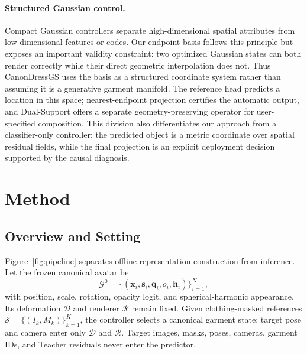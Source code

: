 \documentclass[letterpaper]{article}
\newcommand{\method}{CanonDressGS}
\newcommand{\dual}{Dual-Support}
\begin{document}
\paragraph{Structured Gaussian control.}
Compact Gaussian controllers separate high-dimensional spatial attributes from low-dimensional features or codes. Our endpoint basis follows this principle but exposes an important validity constraint: two optimized Gaussian states can both render correctly while their direct geometric interpolation does not. Thus \method{} uses the basis as a structured coordinate system rather than assuming it is a generative garment manifold. The reference head predicts a location in this space; nearest-endpoint projection certifies the automatic output, and \dual{} offers a separate geometry-preserving operator for user-specified composition.
This division also differentiates our approach from a classifier-only controller: the predicted object is a metric coordinate over spatial residual fields, while the final projection is an explicit deployment decision supported by the causal diagnosis.

\section{Method}

\subsection{Overview and Setting}

Figure~\ref{fig:pipeline} separates offline representation construction from inference. Let the frozen canonical avatar be
\begin{equation}
\mathcal{G}^{0}=\{(\mathbf{x}_{i},\mathbf{s}_{i},\mathbf{q}_{i},o_i,\mathbf{h}_{i})\}_{i=1}^{N},
\label{eq:base}
\end{equation}
with position, scale, rotation, opacity logit, and spherical-harmonic appearance. Its deformation $\mathcal{D}$ and renderer $\mathcal{R}$ remain fixed. Given clothing-masked references $\mathcal{S}=\{(I_k,M_k)\}_{k=1}^{K}$, the controller selects a canonical garment state; target pose and camera enter only $\mathcal{D}$ and $\mathcal{R}$. Target images, masks, poses, cameras, garment IDs, and Teacher residuals never enter the predictor.
\end{document}
